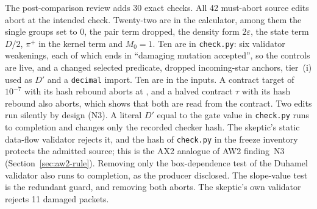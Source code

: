 The post-comparison review adds 30 exact checks. All 42 must-abort source
edits abort at the intended check. Twenty-two are in the calculator, among
them the single groups set to $0$, the pair term dropped, the density form
$2\varepsilon$, the state term $D/2$, $\pi^+$ in the kernel term and $M_0=1$.
Ten are in \texttt{check.py}: six validator weakenings, each of which ends in
``damaging mutation accepted'', so the controls are live, and a changed
selected predicate, dropped incoming-star anchors, tier~(i) used as $D'$ and a
\texttt{decimal} import. Ten are in the inputs. A contract target of $10^{-7}$
with its hash rebound aborts at , and a halved
contract $\tau$ with its hash rebound also aborts, which shows that both are
read from the contract. Two edits run silently by design (N3). A literal $D'$
equal to the gate value in \texttt{check.py} runs to completion and changes
only the recorded checker hash. The skeptic's static data-flow validator
rejects it, and the hash of \texttt{check.py} in the freeze inventory protects
the admitted source; this is the AX2 analogue of AW2 finding~N3
(Section~\ref{sec:aw2-rule}). Removing only the box-dependence test of the
Duhamel validator also runs to completion, as the producer disclosed. The
slope-value test is the redundant guard, and removing both aborts. The
skeptic's own validator rejects 11 damaged packets.

